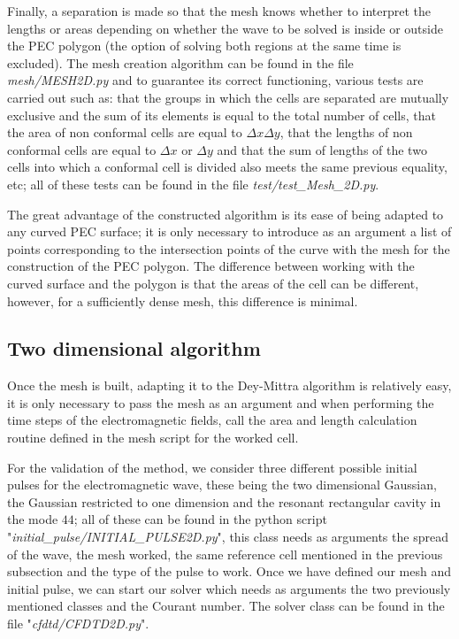 \documentclass[12pt, oneside]{book}
\begin{document}
Finally, a separation is made so that the mesh knows whether to interpret the lengths or areas depending on whether the wave to be solved is inside or outside the PEC polygon (the option of solving both regions at the same time is excluded). The mesh creation algorithm can be found in the file \textit{mesh/MESH2D.py} and to guarantee its correct functioning, various tests are carried out such as: that the groups in which the cells are separated are mutually exclusive and the sum of its elements is equal to the total number of cells, that the area of non conformal cells are equal to $\Delta x \Delta y$, that the lengths of non conformal cells are equal to $\Delta x$ or $\Delta y$ and that the sum of lengths of the two cells into which a conformal cell is divided also meets the same previous equality, etc; all of these tests can be found in the file \textit{test/test\_Mesh\_2D.py}. 

The great advantage of the constructed algorithm is its ease of being adapted to any curved PEC surface; it is only necessary to introduce as an argument a list of points corresponding to the intersection points of the curve with the mesh for the construction of the PEC polygon. The difference between working with the curved surface and the polygon is that the areas of the cell can be different, however, for a sufficiently dense mesh, this difference is minimal.

\subsection{Two dimensional algorithm}

Once the mesh is built, adapting it to the Dey-Mittra algorithm is relatively easy, it is only necessary to pass the mesh as an argument and when performing the time steps of the electromagnetic fields, call the area and length calculation routine defined in the mesh script for the worked cell. 

For the validation of the method, we consider three different possible initial pulses for the electromagnetic wave, these being the two dimensional Gaussian, the Gaussian restricted to one dimension and the resonant rectangular cavity in the mode $44$; all of these can be found in the python script "\textit{initial\_pulse/INITIAL\_PULSE2D.py}", this class needs as arguments the spread of the wave, the mesh worked, the same reference cell mentioned in the previous subsection and the type of the pulse to work. Once we have defined our mesh and initial pulse, we can start our solver which needs as arguments the two previously mentioned classes and the Courant number. The solver class can be found in the file "\textit{cfdtd/CFDTD2D.py}".
\end{document}
